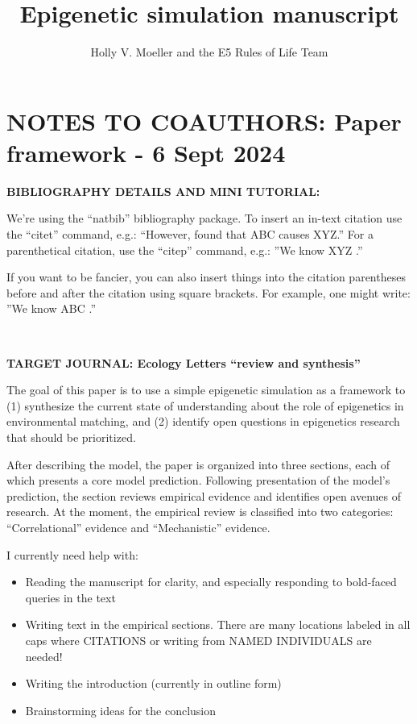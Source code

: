 \documentclass{article}
\title{Epigenetic simulation manuscript}
\author{Holly V. Moeller and the E5 Rules of Life Team }
\date{}
\begin{document}
\maketitle

\section*{NOTES TO COAUTHORS: Paper framework - 6 Sept 2024}


\noindent \textbf{BIBLIOGRAPHY DETAILS AND MINI TUTORIAL:}

We're using the ``natbib'' bibliography package. To insert an in-text citation use the ``citet'' command, e.g.: ``However, \citet{liew2018epigenome} found that ABC causes XYZ.'' For a parenthetical citation, use the ``citep'' command, e.g.: ''We know XYZ \citep{liew2018epigenome}.''

If you want to be fancier, you can also insert things into the citation parentheses before and after the citation using square brackets. For example, one might write: ''We know ABC \citep[see, e.g.,][]{liew2018epigenome}.''

\ 




\noindent \textbf{TARGET JOURNAL: Ecology Letters ``review and synthesis''}   

The goal of this paper is to use a simple epigenetic simulation as a framework to (1) synthesize the current state of understanding about the role of epigenetics in environmental matching, and (2) identify open questions in epigenetics research that should be prioritized. 

After describing the model, the paper is organized into three sections, each of which presents a core model prediction. Following presentation of the model's prediction, the section reviews empirical evidence and identifies open avenues of research. At the moment, the empirical review is classified into two categories: ``Correlational'' evidence and ``Mechanistic'' evidence.

I currently need help with:
\begin{itemize}
    \item Reading the manuscript for clarity, and especially responding to bold-faced queries in the text
    \item Writing text in the empirical sections. There are many locations labeled in all caps where CITATIONS or writing from NAMED INDIVIDUALS are needed!
    \item Writing the introduction (currently in outline form)
    \item Brainstorming ideas for the conclusion
\end{itemize}
\end{document}
